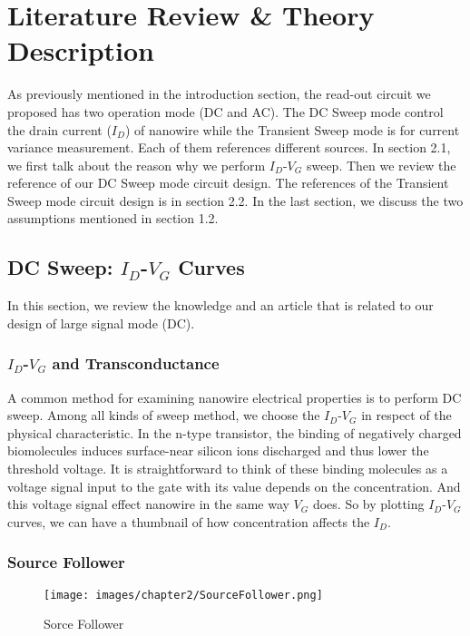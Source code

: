 \chapter{Literature Review \& Theory Description}
As previously mentioned in the introduction section, the read-out circuit we proposed has two operation mode (DC and AC).
The DC Sweep mode control the drain current ($I_D$) of nanowire while the Transient Sweep mode is for current variance measurement.
Each of them references different sources.
In section 2.1, we first talk about the reason why we perform $I_D$-$V_G$ sweep.
Then we review the reference of our DC Sweep mode circuit design.
The references of the Transient Sweep mode circuit design is in section 2.2.
In the last section, we discuss the two assumptions mentioned in section 1.2.

\section{DC Sweep: $I_D$-$V_G$ Curves}
In this section, we review the knowledge and an article that is related to our design of large signal mode (DC).

\subsection{$I_D$-$V_G$ and Transconductance}
A common method for examining nanowire electrical properties is to perform DC sweep.
Among all kinds of sweep method, we choose the $I_D$-$V_G$ in respect of the physical characteristic.
In the n-type transistor, the binding of negatively charged biomolecules induces surface-near silicon ions discharged and thus lower the threshold voltage.
It is straightforward to think of these binding molecules as a voltage signal input to the gate with its value depends on the concentration.
And this voltage signal effect nanowire in the same way $V_G$ does.
So by plotting $I_D$-$V_G$  curves, we can have a thumbnail of how concentration affects the $I_D$.


\subsection{Source Follower} \label{section:SF}

\begin{figure}[h]
    \centering
    \texttt{[image: images/chapter2/SourceFollower.png]}
    \fontsize{6}{7}\selectfont
    \caption{Sorce Follower}
    \label{fig:SF}
\end{figure}

